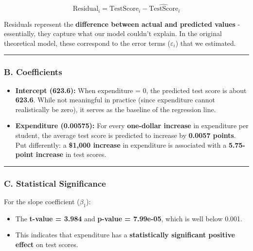 \documentclass[
  12pt,
  a4paper,
]{scrbook}
\providecommand{\tightlist}{%
  \setlength{\itemsep}{0pt}\setlength{\parskip}{0pt}}
\renewcommand{\tightlist}{\setlength{\itemsep}{0.5\baselineskip}\setlength{\parskip}{0.2\baselineskip}}
\theoremstyle{plain}
\theoremstyle{definition}
\theoremstyle{remark}
\begin{document}
\[
\text{Residual}_i = \text{TestScore}_i - \widehat{\text{TestScore}}_i
\]

Residuals represent the \textbf{difference between actual and predicted
values} - essentially, they capture what our model couldn't explain. In
the original theoretical model, these correspond to the error terms
(\(\varepsilon_i\)) that we estimated.

\begin{center}\rule{0.5\linewidth}{0.5pt}\end{center}

\subsubsection{\texorpdfstring{B.
\textbf{Coefficients}}{B. Coefficients}}\label{b.-coefficients}

\begin{itemize}
\item
  \textbf{Intercept (623.6):} When expenditure = 0, the predicted test
  score is about \textbf{623.6}. While not meaningful in practice (since
  expenditure cannot realistically be zero), it serves as the baseline
  of the regression line.
\item
  \textbf{Expenditure (0.00575):} For every \textbf{one-dollar increase}
  in expenditure per student, the average test score is predicted to
  increase by \textbf{0.0057 points}. Put differently: a
  \textbf{{\$1,000} increase} in expenditure is associated with a
  \textbf{5.75-point increase} in test scores.
\end{itemize}

\begin{center}\rule{0.5\linewidth}{0.5pt}\end{center}

\subsubsection{\texorpdfstring{C. \textbf{Statistical
Significance}}{C. Statistical Significance}}\label{c.-statistical-significance}

For the slope coefficient (\(\beta_1\)):

\begin{itemize}
\tightlist
\item
  The \textbf{t-value = 3.984} and \textbf{p-value = 7.99e-05}, which is
  well below 0.001.
\item
  This indicates that expenditure has a \textbf{statistically
  significant positive effect} on test scores.
\end{itemize}
\end{document}
